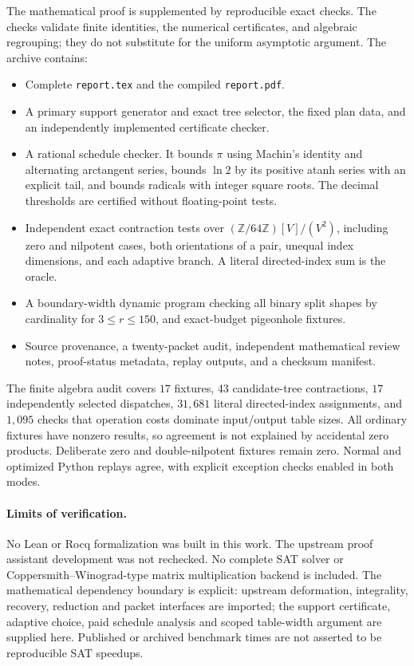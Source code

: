 \documentclass[11pt]{article}
\theoremstyle{remark}\newtheorem{remark}[theorem]{Remark}
\begin{document}
The mathematical proof is supplemented by reproducible exact checks. The
checks validate finite identities, the numerical certificates, and algebraic
regrouping; they do not substitute for the uniform asymptotic argument.
The archive contains:
\begin{itemize}
\item Complete \texttt{report.tex} and the compiled \texttt{report.pdf}.
\item A primary support generator and exact tree selector, the fixed plan
data, and an independently implemented certificate checker.
\item A rational schedule checker. It bounds $\pi$ using Machin's identity
and alternating arctangent series, bounds $\ln2$ by its positive atanh
series with an explicit tail, and bounds radicals with integer square
roots. The decimal thresholds are certified without floating-point tests.
\item Independent exact contraction tests over
$(\mathbb Z/64\mathbb Z)[V]/(V^2)$, including zero and nilpotent cases,
both orientations of a pair, unequal index dimensions, and each adaptive
branch. A literal directed-index sum is the oracle.
\item A boundary-width dynamic program checking all binary split shapes by
cardinality for $3\le r\le150$, and exact-budget pigeonhole fixtures.
\item Source provenance, a twenty-packet audit, independent mathematical
review notes, proof-status metadata, replay outputs, and a checksum manifest.
\end{itemize}

The finite algebra audit covers $17$ fixtures, $43$ candidate-tree
contractions, $17$ independently selected dispatches, $31{,}681$ literal
directed-index assignments, and $1{,}095$ checks that operation costs dominate
input/output table sizes. All ordinary fixtures have nonzero results, so
agreement is not explained by accidental zero products. Deliberate zero and
double-nilpotent fixtures remain zero. Normal and optimized Python replays
agree, with explicit exception checks enabled in both modes.

\paragraph{Limits of verification.}
No Lean or Rocq formalization was built in this work. The upstream proof
assistant development was not rechecked. No complete SAT solver or
Coppersmith--Winograd-type matrix multiplication backend is included.
The mathematical dependency boundary is explicit: upstream deformation,
integrality, recovery, reduction and packet interfaces are imported; the
support certificate, adaptive choice, paid schedule analysis and scoped
table-width argument are supplied here. Published or archived benchmark
times are not asserted to be reproducible SAT speedups.
\end{document}
